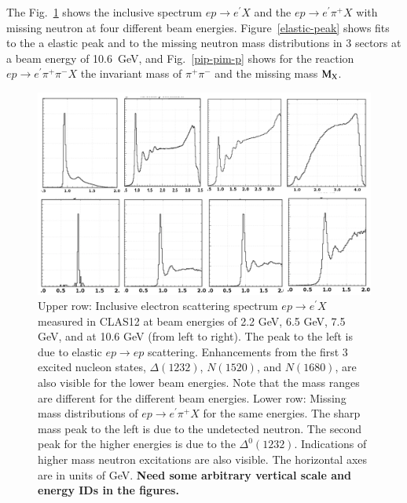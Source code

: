 \documentclass[final,3p,twocolumn]{elsarticle}
\begin{document}
The Fig.~\ref{spectrum} shows the inclusive spectrum $ep \to e^\prime X$ and the $ep \to e^\prime \pi^+ X$ with missing neutron 
at four different beam energies. Figure~\ref{elastic-peak} shows fits to the a elastic peak and to the missing neutron mass distributions
in 3 sectors at a beam energy of 10.6~GeV, and Fig.~\ref{pip-pim-p} shows for the reaction $ep \to e^\prime \pi^+ \pi^- X$ the invariant 
mass of $\pi^+\pi^-$ and the missing mass $\rm M_X$.  
\begin{figure}[ht]
\centerline{\includegraphics[width=1.0\columnwidth]{W-spectrum.png}}
\caption{Upper row: Inclusive electron scattering spectrum $ep \to e^\prime X$ measured in CLAS12 at beam energies 
of 2.2 GeV, 6.5 GeV, 7.5 GeV, and at 10.6 GeV (from left to right). 
The peak to the left is due to elastic $ep \to ep$ scattering. Enhancements from the first 3 excited nucleon states, $\Delta(1232)$, $N(1520)$, and $N(1680)$, are also visible for the lower beam energies. Note that the mass ranges  are different for the different beam energies. 
Lower row:  Missing mass distributions of $ep\to e^\prime \pi^+X$ for the same energies. The sharp mass peak to the left is due to 
 the undetected neutron. The second peak for the higher energies is due to the $\Delta^0(1232)$. Indications of higher mass neutron 
 excitations are also visible. The horizontal axes are in units of GeV. {\bf Need some arbitrary vertical scale and energy  IDs in the figures.} } 
\label{spectrum}
\end{figure} 
\end{document}
